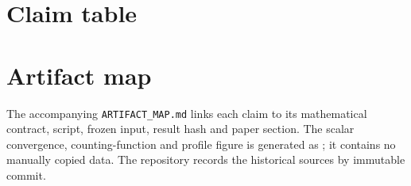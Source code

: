 \documentclass{article}
\begin{document}
\appendix
\section{Claim table}

\section{Artifact map}
The accompanying \texttt{ARTIFACT\_MAP.md} links each claim to its
mathematical contract, script, frozen input, result hash and paper section.
The scalar convergence, counting-function and profile figure is generated
as ; it contains no manually copied
data. The repository records the historical sources by immutable commit.


\end{document}
